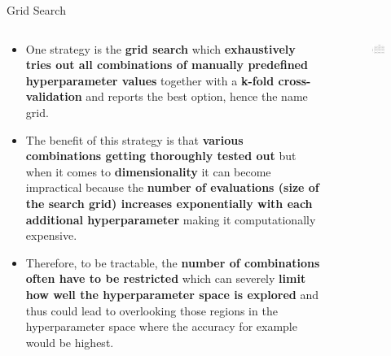 \documentclass[document.tex]{subfiles}
\begin{document}
    \begin{frame}{Grid Search}
        \begin{columns}
            \begin{column}{.6\textwidth}
               \begin{itemize}
                    \item One strategy is the \textbf{grid search} which \textbf{exhaustively tries out all combinations of manually predefined hyperparameter values} together with a \textbf{k-fold cross-validation} and reports the best option, hence the name grid.
                    \item The benefit of this strategy is that \textbf{various combinations getting thoroughly tested out} but when it comes to \textbf{dimensionality} it can become impractical because the \textbf{number of evaluations (size of the search grid) increases exponentially with each additional hyperparameter} making it computationally expensive.
                    \item Therefore, to be tractable, the \textbf{number of combinations often have to be restricted} which can severely \textbf{limit how well the hyperparameter space is explored} and thus could lead to overlooking those regions in the hyperparameter space where the accuracy for example would be highest.
                \end{itemize}
            \end{column}
            \begin{column}{.4\textwidth}
                \begin{figure}
                    \label{fig:grid-search}
                    \includegraphics[width=\textwidth]{figures/drawio/grid-search.png}
                \end{figure}
            \end{column}
        \end{columns}
    \end{frame}
    
\end{document}
